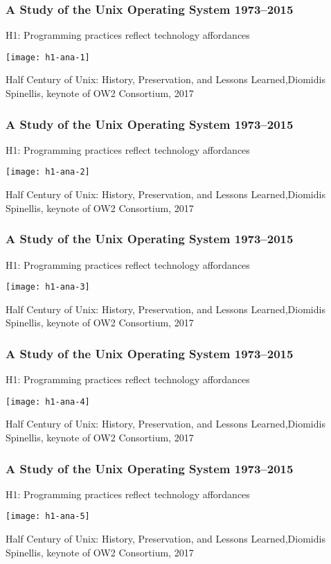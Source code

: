 \begin{frame}[plain]
	\frametitle{A Study of the Unix Operating System 1973–2015}
	\centering
H1: Programming practices reflect
technology affordances

	\texttt{[image: h1-ana-1]}
	
	\tiny Half Century of Unix:
	History, Preservation, and
	Lessons Learned,Diomidis Spinellis, keynote of OW2 Consortium, 2017
\end{frame}	


\begin{frame}[plain]
	\frametitle{A Study of the Unix Operating System 1973–2015}
	\centering
	H1: Programming practices reflect
	technology affordances
	
	\texttt{[image: h1-ana-2]}

	\tiny Half Century of Unix:
History, Preservation, and
Lessons Learned,Diomidis Spinellis, keynote of OW2 Consortium, 2017
	
\end{frame}	


\begin{frame}[plain]
	\frametitle{A Study of the Unix Operating System 1973–2015}
	\centering
	H1: Programming practices reflect
	technology affordances
	
	\texttt{[image: h1-ana-3]}

	\tiny Half Century of Unix:
History, Preservation, and
Lessons Learned,Diomidis Spinellis, keynote of OW2 Consortium, 2017
	
\end{frame}	


\begin{frame}[plain]
	\frametitle{A Study of the Unix Operating System 1973–2015}
	\centering
	H1: Programming practices reflect
	technology affordances
	
	\texttt{[image: h1-ana-4]}

	\tiny Half Century of Unix:
History, Preservation, and
Lessons Learned,Diomidis Spinellis, keynote of OW2 Consortium, 2017
	
\end{frame}	



\begin{frame}[plain]
	\frametitle{A Study of the Unix Operating System 1973–2015}
	\centering
	H1: Programming practices reflect
	technology affordances
	
	\texttt{[image: h1-ana-5]}
	
	\tiny Half Century of Unix:
	History, Preservation, and
	Lessons Learned,Diomidis Spinellis, keynote of OW2 Consortium, 2017
	
\end{frame}	



